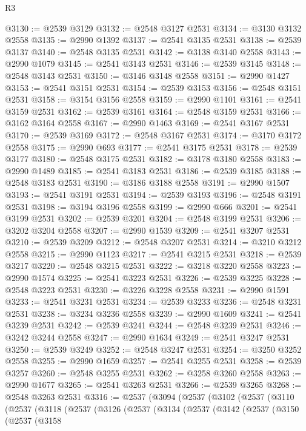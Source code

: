 \begin{lexlean}{R3}
\begin{coremodule}
@3130 := @2539 @3129
@3132 := @2548 @3127 @2531
@3134 := @3130 @3132 @2558
@3135 := @2990 @1392
@3137 := @2541 @3135 @2531
@3138 := @2539 @3137
@3140 := @2548 @3135 @2531
@3142 := @3138 @3140 @2558
@3143 := @2990 @1079
@3145 := @2541 @3143 @2531
@3146 := @2539 @3145
@3148 := @2548 @3143 @2531
@3150 := @3146 @3148 @2558
@3151 := @2990 @1427
@3153 := @2541 @3151 @2531
@3154 := @2539 @3153
@3156 := @2548 @3151 @2531
@3158 := @3154 @3156 @2558
@3159 := @2990 @1101
@3161 := @2541 @3159 @2531
@3162 := @2539 @3161
@3164 := @2548 @3159 @2531
@3166 := @3162 @3164 @2558
@3167 := @2990 @1463
@3169 := @2541 @3167 @2531
@3170 := @2539 @3169
@3172 := @2548 @3167 @2531
@3174 := @3170 @3172 @2558
@3175 := @2990 @693
@3177 := @2541 @3175 @2531
@3178 := @2539 @3177
@3180 := @2548 @3175 @2531
@3182 := @3178 @3180 @2558
@3183 := @2990 @1489
@3185 := @2541 @3183 @2531
@3186 := @2539 @3185
@3188 := @2548 @3183 @2531
@3190 := @3186 @3188 @2558
@3191 := @2990 @1507
@3193 := @2541 @3191 @2531
@3194 := @2539 @3193
@3196 := @2548 @3191 @2531
@3198 := @3194 @3196 @2558
@3199 := @2990 @666
@3201 := @2541 @3199 @2531
@3202 := @2539 @3201
@3204 := @2548 @3199 @2531
@3206 := @3202 @3204 @2558
@3207 := @2990 @1539
@3209 := @2541 @3207 @2531
@3210 := @2539 @3209
@3212 := @2548 @3207 @2531
@3214 := @3210 @3212 @2558
@3215 := @2990 @1123
@3217 := @2541 @3215 @2531
@3218 := @2539 @3217
@3220 := @2548 @3215 @2531
@3222 := @3218 @3220 @2558
@3223 := @2990 @1574
@3225 := @2541 @3223 @2531
@3226 := @2539 @3225
@3228 := @2548 @3223 @2531
@3230 := @3226 @3228 @2558
@3231 := @2990 @1591
@3233 := @2541 @3231 @2531
@3234 := @2539 @3233
@3236 := @2548 @3231 @2531
@3238 := @3234 @3236 @2558
@3239 := @2990 @1609
@3241 := @2541 @3239 @2531
@3242 := @2539 @3241
@3244 := @2548 @3239 @2531
@3246 := @3242 @3244 @2558
@3247 := @2990 @1634
@3249 := @2541 @3247 @2531
@3250 := @2539 @3249
@3252 := @2548 @3247 @2531
@3254 := @3250 @3252 @2558
@3255 := @2990 @1659
@3257 := @2541 @3255 @2531
@3258 := @2539 @3257
@3260 := @2548 @3255 @2531
@3262 := @3258 @3260 @2558
@3263 := @2990 @1677
@3265 := @2541 @3263 @2531
@3266 := @2539 @3265
@3268 := @2548 @3263 @2531
@3316 := @2537
    (@3094
      (@2537
        (@3102
          (@2537
            (@3110
              (@2537
                (@3118
                  (@2537
                    (@3126
                      (@2537
                        (@3134
                          (@2537
                            (@3142
                              (@2537
                                (@3150
                                  (@2537
                                    (@3158

\end{coremodule}
\end{lexlean}
